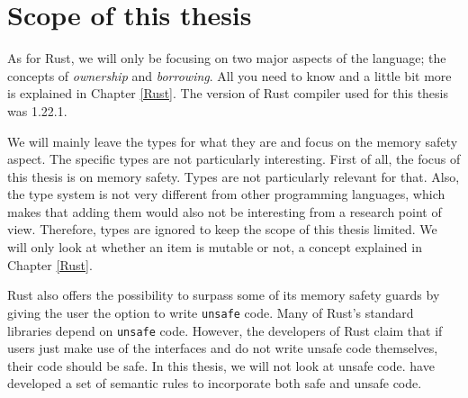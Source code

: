




\section{Scope of this thesis}
As for Rust, we will only be focusing on two major aspects of the language; the concepts of \emph{ownership} and \emph{borrowing}. All you need to know and a little bit more is explained in Chapter \ref{Rust}. The version of Rust compiler used for this thesis was 1.22.1. 

We will mainly leave the types for what they are and focus on the memory safety aspect. The specific types are not particularly interesting. First of all, the focus of this thesis is on memory safety. Types are not particularly relevant for that. Also, the type system is not very different from other programming languages, which makes that adding them would also not be interesting from a research point of view. Therefore, types are ignored to keep the scope of this thesis limited. We will only look at whether an item is mutable or not, a concept explained in Chapter \ref{Rust}. 

Rust also offers the possibility to surpass some of its memory safety guards by giving the user the option to write \texttt{unsafe} code. Many of Rust's standard libraries depend on \texttt{unsafe} code. However, the developers of Rust claim that if users just make use of the interfaces and do not write unsafe code themselves, their code should be safe. In this thesis, we will not look at unsafe code. \cite{jung2017rustbelt} have developed a set of semantic rules to incorporate both safe and unsafe code. 

